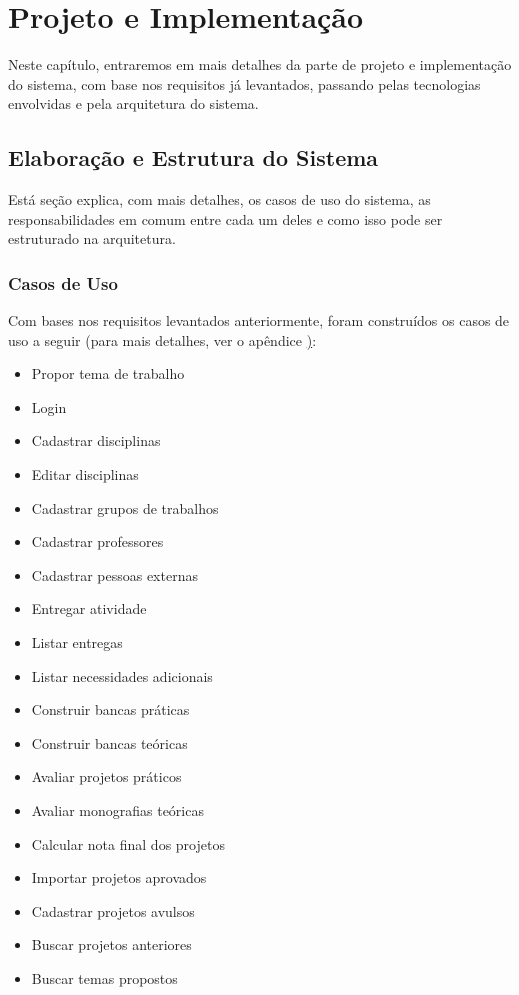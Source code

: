 \chapter{Projeto e Implementação}
Neste capítulo, entraremos em mais detalhes da parte de projeto e implementação do sistema, com base nos requisitos já levantados, passando pelas tecnologias envolvidas e pela arquitetura do sistema.

\section{Elaboração e Estrutura do Sistema}
Está seção explica, com mais detalhes, os casos de uso do sistema, as responsabilidades em comum entre cada um deles e como isso pode ser estruturado na arquitetura.

\subsection{Casos de Uso}
Com bases nos requisitos levantados anteriormente, foram construídos os casos de uso a seguir (para mais detalhes, ver o apêndice \href{chap:use-case-appendix}):

\begin{itemize}
    \item Propor tema de trabalho
    \item Login
    \item Cadastrar disciplinas
    \item Editar disciplinas
    \item Cadastrar grupos de trabalhos
    \item Cadastrar professores
    \item Cadastrar pessoas externas
    \item Entregar atividade
    \item Listar entregas
    \item Listar necessidades adicionais
    \item Construir bancas práticas
    \item Construir bancas teóricas
    \item Avaliar projetos práticos
    \item Avaliar monografias teóricas
    \item Calcular nota final dos projetos
    \item Importar projetos aprovados
    \item Cadastrar projetos avulsos
    \item Buscar projetos anteriores
    \item Buscar temas propostos
\end{itemize}

